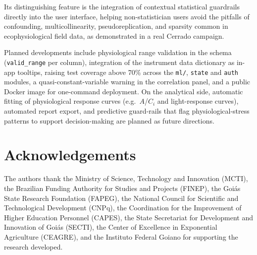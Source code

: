 \documentclass[preprint,12pt,a4paper]{elsarticle}
\begin{document}
Its distinguishing feature is the integration of contextual statistical guardrails directly into the user interface, helping non-statistician users avoid the pitfalls of confounding, multicollinearity, pseudoreplication, and sparsity common in ecophysiological field data, as demonstrated in a real Cerrado campaign.

Planned developments include physiological range validation in the schema (\texttt{valid\_range} per column), integration of the instrument data dictionary as in-app tooltips, raising test coverage above 70\% across the \texttt{ml/}, \texttt{state} and \texttt{auth} modules, a quasi-constant-variable warning in the correlation panel, and a public Docker image for one-command deployment. On the analytical side, automatic fitting of physiological response curves (e.g.\ $A$/$C_i$ and light-response curves), automated report export, and predictive guard-rails that flag physiological-stress patterns to support decision-making are planned as future directions.

\section*{Acknowledgements}

The authors thank the Ministry of Science, Technology and Innovation (MCTI), the Brazilian Funding Authority for Studies and Projects (FINEP), the Goi\'as State Research Foundation (FAPEG), the National Council for Scientific and Technological Development (CNPq), the Coordination for the Improvement of Higher Education Personnel (CAPES), the State Secretariat for Development and Innovation of Goi\'as (SECTI), the Center of Excellence in Exponential Agriculture (CEAGRE), and the Instituto Federal Goiano for supporting the research developed.



\end{document}
